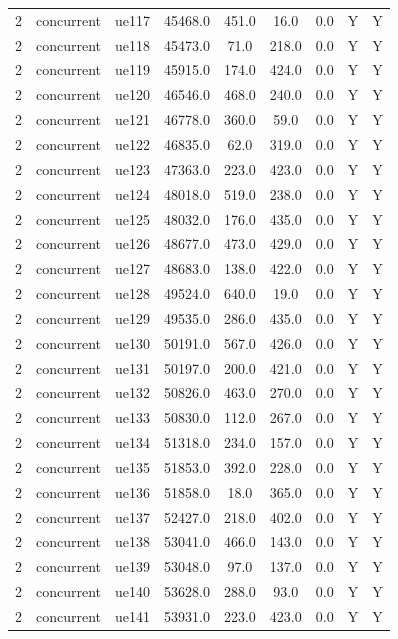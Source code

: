 \begin{table}[ht]
\begin{tabular}{|c|c|c|c|c|c|c|c|c|}
2 & concurrent & ue117 & 45468.0 & 451.0 & 16.0 & 0.0 & Y & Y \\
2 & concurrent & ue118 & 45473.0 & 71.0 & 218.0 & 0.0 & Y & Y \\
2 & concurrent & ue119 & 45915.0 & 174.0 & 424.0 & 0.0 & Y & Y \\
2 & concurrent & ue120 & 46546.0 & 468.0 & 240.0 & 0.0 & Y & Y \\
2 & concurrent & ue121 & 46778.0 & 360.0 & 59.0 & 0.0 & Y & Y \\
2 & concurrent & ue122 & 46835.0 & 62.0 & 319.0 & 0.0 & Y & Y \\
2 & concurrent & ue123 & 47363.0 & 223.0 & 423.0 & 0.0 & Y & Y \\
2 & concurrent & ue124 & 48018.0 & 519.0 & 238.0 & 0.0 & Y & Y \\
2 & concurrent & ue125 & 48032.0 & 176.0 & 435.0 & 0.0 & Y & Y \\
2 & concurrent & ue126 & 48677.0 & 473.0 & 429.0 & 0.0 & Y & Y \\
2 & concurrent & ue127 & 48683.0 & 138.0 & 422.0 & 0.0 & Y & Y \\
2 & concurrent & ue128 & 49524.0 & 640.0 & 19.0 & 0.0 & Y & Y \\
2 & concurrent & ue129 & 49535.0 & 286.0 & 435.0 & 0.0 & Y & Y \\
2 & concurrent & ue130 & 50191.0 & 567.0 & 426.0 & 0.0 & Y & Y \\
2 & concurrent & ue131 & 50197.0 & 200.0 & 421.0 & 0.0 & Y & Y \\
2 & concurrent & ue132 & 50826.0 & 463.0 & 270.0 & 0.0 & Y & Y \\
2 & concurrent & ue133 & 50830.0 & 112.0 & 267.0 & 0.0 & Y & Y \\
2 & concurrent & ue134 & 51318.0 & 234.0 & 157.0 & 0.0 & Y & Y \\
2 & concurrent & ue135 & 51853.0 & 392.0 & 228.0 & 0.0 & Y & Y \\
2 & concurrent & ue136 & 51858.0 & 18.0 & 365.0 & 0.0 & Y & Y \\
2 & concurrent & ue137 & 52427.0 & 218.0 & 402.0 & 0.0 & Y & Y \\
2 & concurrent & ue138 & 53041.0 & 466.0 & 143.0 & 0.0 & Y & Y \\
2 & concurrent & ue139 & 53048.0 & 97.0 & 137.0 & 0.0 & Y & Y \\
2 & concurrent & ue140 & 53628.0 & 288.0 & 93.0 & 0.0 & Y & Y \\
2 & concurrent & ue141 & 53931.0 & 223.0 & 423.0 & 0.0 & Y & Y \\

\end{tabular}
\end{table}
